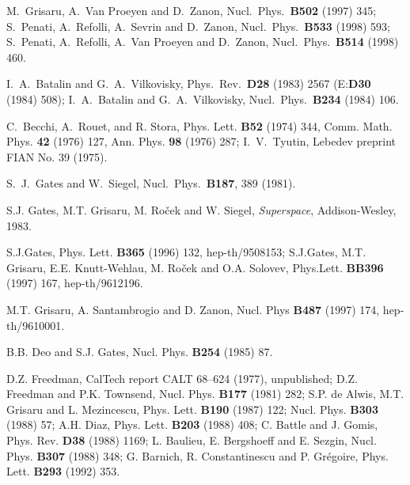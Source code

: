 \documentclass[a4paper,12pt]{article}
\begin{document}
\begin{thebibliography}{999}

 M.~Grisaru, A.~Van Proeyen and D.~Zanon,
  Nucl.\ Phys.\ {\bf B502} (1997) 345; S.~Penati, A.~Refolli,
  A.~Sevrin and D.~Zanon,
   Nucl.\ Phys.\  {\bf B533} (1998) 593; S.~Penati, A.~Refolli,
   A.~Van Proeyen and D.~Zanon, 
   Nucl.\ Phys.\  {\bf B514} (1998) 460.


  I.~A.~Batalin and G.~A.~Vilkovisky, 
  Phys.\ Rev.\ {\bf D28} (1983) 2567 (E:{\bf D30} (1984) 508);
  I.~A.~Batalin and G.~A.~Vilkovisky, 
  Nucl.\ Phys.\ {\bf  B234} (1984) 106.

 C.~Becchi, A.~Rouet, and R. Stora, Phys. Lett. {\bf B52} (1974) 344,
 Comm. Math. Phys. {\bf 42} (1976) 127,  
Ann. Phys. {\bf 98} (1976) 287; I.~V.~Tyutin, Lebedev preprint FIAN
No. 39 (1975). 

S.~J.~Gates and W.~Siegel,
Nucl.\ Phys.\  {\bf B187}, 389 (1981).

  S.J. Gates, M.T. Grisaru, M. Ro\v{c}ek and W. Siegel,
  {\em Superspace}, Addison-Wesley, 1983.

  S.J.Gates, Phys. Lett. {\bf B365} (1996) 132, hep-th/9508153;
  S.J.Gates, M.T. Grisaru, E.E. Knutt-Wehlau, M. Ro\v{c}ek and O.A. Solovev,
  Phys.Lett. {\bf BB396} (1997) 167, hep-th/9612196.

  M.T. Grisaru, A. Santambrogio and D. Zanon,
  Nucl. Phys {\bf B487} (1997) 174, hep-th/9610001.

  B.B. Deo and S.J. Gates, Nucl. Phys. {\bf B254} (1985) 87.
  

D.Z. Freedman, CalTech report CALT 68--624 (1977),
unpublished; D.Z. Freedman and P.K. Townsend, Nucl. Phys. {\bf B177}
(1981) 282; 
S.P. de Alwis, M.T. Grisaru and L. Mezincescu, Phys. Lett. {\bf B190}
(1987) 122; Nucl. Phys. {\bf B303} (1988) 57;
A.H. Diaz, Phys. Lett. {\bf B203} (1988) 408;
C. Battle and J. Gomis, Phys. Rev. {\bf D38} (1988) 1169;
L. Baulieu, E. Bergshoeff and E. Sezgin, Nucl. Phys. {\bf B307} (1988)
348; G. Barnich, R. Constantinescu and P. Gr\'egoire, Phys. Lett. {\bf B293}
(1992) 353.



\end{thebibliography}
\end{document}
